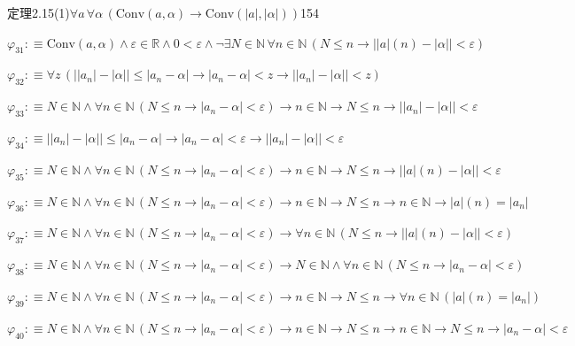 \begin{fullproof}{定理2.15(1)}{$\forall a\,\forall \alpha\,(\mathrm{Conv}(a,\alpha) \to \mathrm{Conv}(\lvert a \rvert,\lvert \alpha \rvert))$}{154}
\begin{abbrevlist}
\item $\varphi_{31} :\equiv \mathrm{Conv}(a,\alpha) \land \varepsilon \in \mathbb{R} \land 0 < \varepsilon \land \neg \exists N \in \mathbb{N}\,\forall n \in \mathbb{N}\,(N \leq n \to \lvert \lvert a \rvert(n) - \lvert \alpha \rvert \rvert < \varepsilon)$
\item $\varphi_{32} :\equiv \forall z\,(\lvert \lvert a_{n} \rvert - \lvert \alpha \rvert \rvert \leq \lvert a_{n} - \alpha \rvert \to \lvert a_{n} - \alpha \rvert < z \to \lvert \lvert a_{n} \rvert - \lvert \alpha \rvert \rvert < z)$
\item $\varphi_{33} :\equiv N \in \mathbb{N} \land \forall n \in \mathbb{N}\,(N \leq n \to \lvert a_{n} - \alpha \rvert < \varepsilon) \to n \in \mathbb{N} \to N \leq n \to \lvert \lvert a_{n} \rvert - \lvert \alpha \rvert \rvert < \varepsilon$
\item $\varphi_{34} :\equiv \lvert \lvert a_{n} \rvert - \lvert \alpha \rvert \rvert \leq \lvert a_{n} - \alpha \rvert \to \lvert a_{n} - \alpha \rvert < \varepsilon \to \lvert \lvert a_{n} \rvert - \lvert \alpha \rvert \rvert < \varepsilon$
\item $\varphi_{35} :\equiv N \in \mathbb{N} \land \forall n \in \mathbb{N}\,(N \leq n \to \lvert a_{n} - \alpha \rvert < \varepsilon) \to n \in \mathbb{N} \to N \leq n \to \lvert \lvert a \rvert(n) - \lvert \alpha \rvert \rvert < \varepsilon$
\item $\varphi_{36} :\equiv N \in \mathbb{N} \land \forall n \in \mathbb{N}\,(N \leq n \to \lvert a_{n} - \alpha \rvert < \varepsilon) \to n \in \mathbb{N} \to N \leq n \to n \in \mathbb{N} \to \lvert a \rvert(n) = \lvert a_{n} \rvert$
\item $\varphi_{37} :\equiv N \in \mathbb{N} \land \forall n \in \mathbb{N}\,(N \leq n \to \lvert a_{n} - \alpha \rvert < \varepsilon) \to \forall n \in \mathbb{N}\,(N \leq n \to \lvert \lvert a \rvert(n) - \lvert \alpha \rvert \rvert < \varepsilon)$
\item $\varphi_{38} :\equiv N \in \mathbb{N} \land \forall n \in \mathbb{N}\,(N \leq n \to \lvert a_{n} - \alpha \rvert < \varepsilon) \to N \in \mathbb{N} \land \forall n \in \mathbb{N}\,(N \leq n \to \lvert a_{n} - \alpha \rvert < \varepsilon)$
\item $\varphi_{39} :\equiv N \in \mathbb{N} \land \forall n \in \mathbb{N}\,(N \leq n \to \lvert a_{n} - \alpha \rvert < \varepsilon) \to n \in \mathbb{N} \to N \leq n \to \forall n \in \mathbb{N}\,(\lvert a \rvert(n) = \lvert a_{n} \rvert)$
\item $\varphi_{40} :\equiv N \in \mathbb{N} \land \forall n \in \mathbb{N}\,(N \leq n \to \lvert a_{n} - \alpha \rvert < \varepsilon) \to n \in \mathbb{N} \to N \leq n \to n \in \mathbb{N} \to N \leq n \to \lvert a_{n} - \alpha \rvert < \varepsilon$

\end{abbrevlist}
\end{fullproof}
